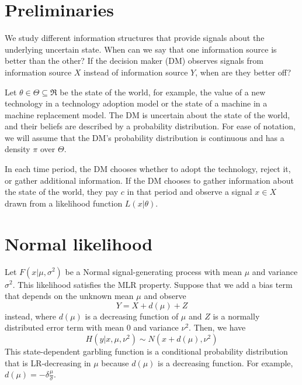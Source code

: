\documentclass[11pt,onecolumn]{article}
\theoremstyle{plain}
\begin{document}
\section{Preliminaries}


We study different information structures that provide signals about the underlying uncertain state. When can we say that one information source is better than the other? If the decision maker (DM) observes signals from information source $X$ instead of information source $Y$, when are they better off?

Let $\theta\in \Theta \subseteq \Re$ be the state of the world, for example, the value of a new technology in a technology adoption model or the state of a machine in a machine replacement model. The DM is uncertain about the state of the world, and their beliefs are described by a probability distribution. For ease of notation, we will assume that the DM's probability distribution is continuous and has a density $\pi$ over $\Theta$.


In each time period, the DM chooses whether to adopt the technology, reject it, or gather additional information. If the DM chooses to gather information about the state of the world, they pay $c$ in that period and observe a signal $x\in X$ drawn from a likelihood function $L(x|\theta)$.







\section{Normal likelihood}
Let $F(x|\mu, \sigma^2)$ be a Normal signal-generating process with mean $\mu$ and variance $\sigma^2$. This likelihood satisfies the MLR property. Suppose that we add a bias term that depends on the unknown mean $\mu$ and observe
\begin{equation}
    Y=X+d(\mu)+Z
\end{equation}
instead, where $d(\mu)$ is a decreasing function of $\mu$ and $Z$ is a normally distributed error term with mean 0 and variance $\nu^2$. Then, we have
\begin{equation}
    H(y|x, \mu, \nu^2)\sim N(x+d(\mu), \nu^2)
\end{equation}
This state-dependent garbling function is a conditional probability distribution that is LR-decreasing in $\mu$ because $d(\mu)$ is a decreasing function. For example, $d(\mu)=-\delta\frac{\mu}{\sigma}$.
\end{document}
